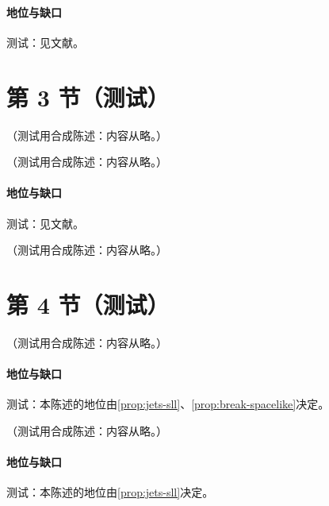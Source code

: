 \paragraph{地位与缺口}测试：见文献。

\section{第 3 节（测试）}\label{sec:break-spacelike}

\begin{example}\label{ex:break-c07}
（测试用合成陈述：内容从略。）
\end{example}

\begin{proposition}\label{prop:break-spacelike}
（测试用合成陈述：内容从略。）
\end{proposition}
\paragraph{地位与缺口}测试：见文献。

\begin{example}\label{ex:break-spacelike}
（测试用合成陈述：内容从略。）
\end{example}

\section{第 4 节（测试）}\label{sec:break-mpi}

\begin{proposition}\label{prop:break-mass-singularity}
（测试用合成陈述：内容从略。）
\end{proposition}
\paragraph{地位与缺口}测试：本陈述的地位由\cref{prop:jets-sll}、\cref{prop:break-spacelike}决定。

\begin{proposition}\label{prop:break-fss}
（测试用合成陈述：内容从略。）
\end{proposition}
\paragraph{地位与缺口}测试：本陈述的地位由\cref{prop:jets-sll}决定。

